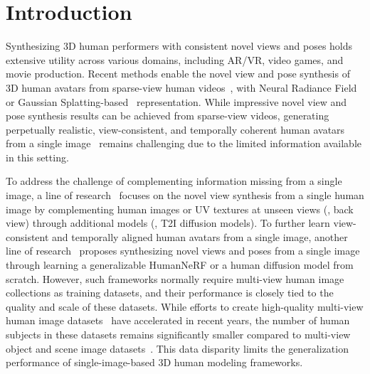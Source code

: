 \section{Introduction}

Synthesizing 3D human performers with consistent novel views and poses holds extensive utility across various domains, including AR/VR, video games, and movie production.
Recent methods enable the novel view and pose synthesis of 3D human avatars from sparse-view human videos~\cite{neuralbody, chen2021animatable, peng2022animatable, xu2021h, noguchi2021neural, weng_humannerf_2022_cvpr, su2021nerf, jiang2022selfrecon, jiang2022neuman, wang2022arah, hu2024gauhuman, chen2023primdiffusion, hong2022eva3d, hu2023humanliff, hong2022avatarclip}, 
with Neural Radiance Field~\cite{mildenhall2021nerf} or Gaussian Splatting-based~\cite{kerbl20233d} representation. 
While impressive novel view and pose synthesis results can be achieved from sparse-view videos, generating perpetually realistic, view-consistent, and temporally coherent human avatars from a single image~\cite{hu2023sherf, dong2023ivs, weng2023zeroavatar, liao2023high, huang2023tech, pan2024humansplat, wang2024geneman, ho2024sith, chen2024generalizable, cha2023generating, casas2023smplitex} remains challenging due to the limited information available in this setting.

To address the challenge of complementing information missing from a single image, a line of research~\cite{weng2023zeroavatar, huang2023tech, pan2024humansplat, casas2023smplitex} focuses on the novel view synthesis from a single human image by complementing human images or UV textures at unseen views (\eg, back view) through additional models (\eg, T2I diffusion models).
To further learn view-consistent and temporally aligned human avatars from a single image, another line of research~\cite{hu2023sherf, shao2024360} proposes synthesizing novel views and poses from a single image through learning a generalizable HumanNeRF or a human diffusion model from scratch.
However, such frameworks normally require multi-view human image collections as training datasets, and their performance is closely tied to the quality and scale of these datasets.
While efforts to create high-quality multi-view human image datasets~\cite{tao2021function4d, han2023high, cheng2023dna, li2021ai, cai2022humman, peng2021neural, ho2023learning, tang2023human, alldieck2018video, ionescu2013human3, mono-3dhp2017, peng2022animatable, habermann2020deepcap, habermann2021real, huang2024wildavatar, icsik2023humanrf, yang2023synbody} have accelerated in recent years, the number of human subjects in these datasets remains significantly smaller compared to multi-view object and scene image datasets~\cite{deitke2023objaverse,wu2023omniobject3d,yu2023mvimgnet,tung2025megascenes, dai2017scannet, zhou2018stereo}. 
This data disparity limits the generalization performance of single-image-based 3D human modeling frameworks.

